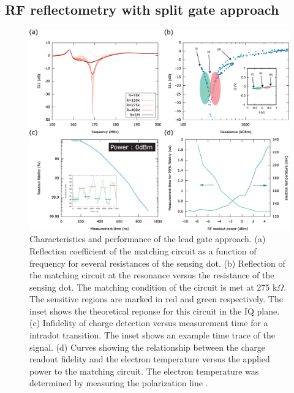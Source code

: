 \documentclass{article}
\begin{document}
\subsection{RF reflectometry with split gate approach}

	\begin{figure}
		\includegraphics[width=\textwidth]{figures/Performance_figure/perfomance_fig_w_inset.eps}
		\caption{Characteristics and performance of the lead gate approach. (a) Reflection coefficient of the matching circuit as a function of frequency for several resistances of the sensing dot. (b) Reflection of the matching circuit at the resonance versus the resistance of the sensing dot. The matching condition of the circuit is met at 275 k$\Omega$. The sensitive regions are marked in red and green respectively. The inset shows the theoretical reponse for this circuit in the IQ plane. (c) Infidelity of charge detection versus measurement time for a intradot transition. The inset shows an example time trace of the signal. (d) Curves showing the relationship between the charge readout fidelity and the electron temperature versus the applied power to the matching circuit. The electron temperature was determined by measuring the polarization line \cite{van2018automated}. }
		\label{fig:lead_gate_result}
	\end{figure}	
\end{document}
